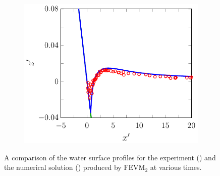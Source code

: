\begin{figure}
\begin{subfigure}{0.5\textwidth}
		\includegraphics[width=\textwidth]{./chp6/figures/Experiment/Synolakis/H0p0185/FEVM/70s.pdf}
	\end{subfigure}
	\caption{A comparison of the water surface profiles for the experiment () and the numerical solution ({\color{blue}\solidrule}) produced by $\text{FEVM}_2$ at various times.}
	\label{fig:SynolakisFEVMNoBreak}
\end{figure}

